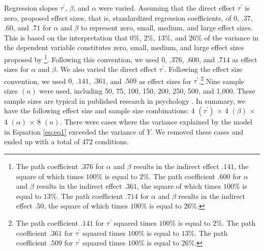 \documentclass[man]{apa7}\usepackage[]{graphicx}\usepackage[]{xcolor}
\begin{document}
Regression slopes ${\tau}^{\prime}$, ${\beta}$,
and ${\alpha}$ were varied.
Assuming that the direct effect ${\tau}^{\prime}$ is zero,
\Textcite{Lib-Mediation-Profile-Likelihood-Cheung-2009a} proposed effect sizes, that is, standardized regression coefficients, of $0$, $.37$, $.60$, and $.71$
for ${\alpha}$ and ${\beta}$
to represent zero, small, medium, and large effect sizes.
This is based on the interpretation
that $0\%$, $2\%$, $13\%$, and $26\%$ of the variance
in the dependent variable constitutes
zero, small, medium, and large effect sizes
proposed by
\Textcite{Lib-NHST-Power-Books-Cohen-1988}\footnote{The path coefficient $.376$ for ${\alpha}$ and ${\beta}$
	results in the indirect effect $.141$,
	the square of which times $100\%$ is equal to $2\%$.
	The path coefficient $.600$ for ${\alpha}$ and ${\beta}$
	results in the indirect effect $.361$,
	the square of which times $100\%$ is equal to $13\%$.
	The path coefficient $.714$ for ${\alpha}$ and ${\beta}$
	results in the indirect effect $.50$,
	the square of which times $100\%$ is equal to $26\%$.
}.
Following this convention,
we used $0$, $.376$, $.600$, and $.714$
as effect sizes for $\alpha$ and $\beta$.
We also varied the direct effect $\tau^{\prime}$.
Following the effect size convention,
we used $0$, $.141$, $.361$, and $.509$
as effect sizes for $\tau^{\prime}$.\footnote{The path coefficient $.141$ for $\tau^{\prime}$
	squared times $100\%$ is equal to $2\%$. 
	The path coefficient $.361$ for $\tau^{\prime}$
	squared times $100\%$ is equal to $13\%$.
	The path coefficient $.509$ for $\tau^{\prime}$
	squared times $100\%$ is equal to $26\%$.
}
Nine sample sizes $\left( n \right)$ were used,
including 50, 75, 100, 150, 200, 250, 500, and 1,000.
These sample sizes are typical in published research in psychology
\parencite{Lib-Mediation-Power-Fritz-2007}.
In summary, we have the following effect size and sample size combinations:
4 $\left( \tau^{\prime} \right)$ $\times$ 
4 $\left( \beta \right)$ $\times$ 
4 $\left( \alpha \right)$ $\times$
8 $\left( n \right)$.
There were cases where the variance explained
by the model in Equation \ref{eq:eq1} exceeded the variance of $Y$.
We removed these cases and ended up with a total of $472$ conditions.
\end{document}

